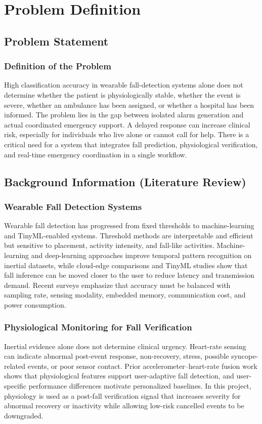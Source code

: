 \chapter{Problem Definition}

\section[Problem Statement]{\textbf{Problem Statement}}

\subsection{Definition of the Problem}
High classification accuracy in wearable fall-detection systems alone does not determine whether the patient is physiologically stable, whether the event is severe, whether an ambulance has been assigned, or whether a hospital has been informed. The problem lies in the gap between isolated alarm generation and actual coordinated emergency support. A delayed response can increase clinical risk, especially for individuals who live alone or cannot call for help. There is a critical need for a system that integrates fall prediction, physiological verification, and real-time emergency coordination in a single workflow.

\section[Background Information (Literature Review)]{\textbf{Background Information (Literature Review)}}

\subsection{Wearable Fall Detection Systems}
Wearable fall detection has progressed from fixed thresholds to machine-learning and TinyML-enabled systems. Threshold methods are interpretable and efficient but sensitive to placement, activity intensity, and fall-like activities. Machine-learning and deep-learning approaches improve temporal pattern recognition on inertial datasets, while cloud-edge comparisons and TinyML studies show that fall inference can be moved closer to the user to reduce latency and transmission demand. Recent surveys emphasize that accuracy must be balanced with sampling rate, sensing modality, embedded memory, communication cost, and power consumption.

\subsection{Physiological Monitoring for Fall Verification}
Inertial evidence alone does not determine clinical urgency. Heart-rate sensing can indicate abnormal post-event response, non-recovery, stress, possible syncope-related events, or poor sensor contact. Prior accelerometer–heart-rate fusion work shows that physiological features support user-adaptive fall detection, and user-specific performance differences motivate personalized baselines. In this project, physiology is used as a post-fall verification signal that increases severity for abnormal recovery or inactivity while allowing low-risk cancelled events to be downgraded.

